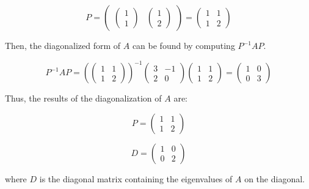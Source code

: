 \documentclass{article}
\begin{document}
\[P = \begin{pmatrix} \begin{pmatrix} 1 \\ 1 \end{pmatrix} & \begin{pmatrix} 1 \\ 2 \end{pmatrix} \end{pmatrix} = \begin{pmatrix} 1 & 1 \\ 1 & 2 \end{pmatrix}\]

Then, the diagonalized form of $A$ can be found by computing $P^{-1}AP$.

\[P^{-1}AP = \left(\begin{pmatrix} 1 & 1 \\ 1 & 2 \end{pmatrix}\right)^{-1} \begin{pmatrix} 3 & -1 \\ 2 & 0 \end{pmatrix} \begin{pmatrix} 1 & 1 \\ 1 & 2 \end{pmatrix} = \begin{pmatrix} 1 & 0 \\ 0 & 3 \end{pmatrix}\]

Thus, the results of the diagonalization of $A$ are:

\[P = \begin{pmatrix} 1 & 1 \\ 1 & 2 \end{pmatrix}\]

\[D = \begin{pmatrix} 1 & 0 \\ 0 & 2 \end{pmatrix}\]

where $D$ is the diagonal matrix containing the eigenvalues of $A$ on the diagonal.
\end{document}

